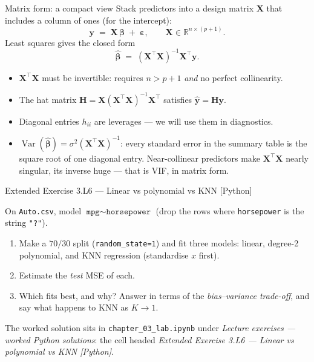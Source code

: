 \documentclass[aspectratio=169,11pt]{beamer}
\begin{document}
\begin{frame}{Matrix form: a compact view}
  Stack predictors into a design matrix $\mathbf{X}$ that includes a
  column of ones (for the intercept):
  \[
    \mathbf{y} \;=\; \mathbf{X}\,\boldsymbol\beta \;+\; \boldsymbol\varepsilon,
    \qquad
    \mathbf{X} \in \mathbb{R}^{n \times (p+1)}.
  \]
  Least squares gives the closed form
  \[
    \boxed{\;
      \hat{\boldsymbol\beta}
        \;=\; (\mathbf{X}^\top \mathbf{X})^{-1}\mathbf{X}^\top \mathbf{y}.
    \;}
  \]
  \begin{readme}
    \begin{itemize}
      \item $\mathbf{X}^\top\mathbf{X}$ must be invertible: requires
            $n > p + 1$ \emph{and} no perfect collinearity.
      \item The hat matrix $\mathbf{H} = \mathbf{X}(\mathbf{X}^\top\mathbf{X})^{-1}\mathbf{X}^\top$
            satisfies $\hat{\mathbf{y}} = \mathbf{H}\mathbf{y}$.
      \item Diagonal entries $h_{ii}$ are leverages --- we will use
            them in diagnostics.
      \item $\operatorname{Var}(\hat{\boldsymbol\beta})
            = \sigma^2(\mathbf{X}^\top\mathbf{X})^{-1}$: every standard
            error in the summary table is the square root of one diagonal
            entry. Near-collinear predictors make
            $\mathbf{X}^\top\mathbf{X}$ nearly singular, its inverse huge
            --- that is VIF, in matrix form.
    \end{itemize}
  \end{readme}
\end{frame}

\begin{frame}[fragile]{Extended Exercise 3.L6 --- Linear vs polynomial vs KNN [Python]}
  \begin{longexercise}
    On \texttt{Auto.csv}, model $\texttt{mpg}\sim\texttt{horsepower}$
    (drop the rows where \texttt{horsepower} is the string \texttt{"?"}).
    \begin{enumerate}
      \item Make a $70/30$ split (\texttt{random\_state=1}) and fit three
            models: linear, degree-2 polynomial, and KNN regression
            (standardise $x$ first).
      \item Estimate the \emph{test} MSE of each.
      \item Which fits best, and why? Answer in terms of the
            \emph{bias--variance trade-off}, and say what happens to KNN as
            $K\to 1$.
    \end{enumerate}
  \end{longexercise}
  \begin{labnote}
    The worked solution sits in \texttt{chapter\_03\_lab.ipynb} under
    \emph{Lecture exercises --- worked Python solutions}: the cell headed
    \emph{Extended Exercise 3.L6 --- Linear vs polynomial vs KNN [Python]}.
  \end{labnote}
\end{frame}
\end{document}
